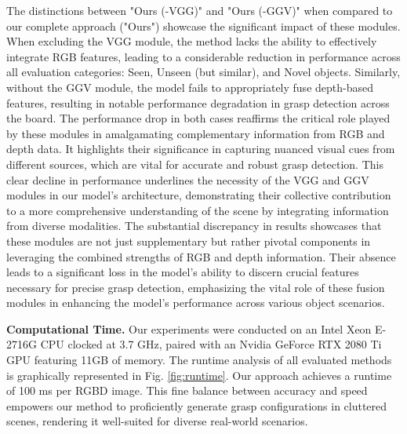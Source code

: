 The distinctions between "Ours (-VGG)" and "Ours (-GGV)" when compared to our complete approach ("Ours") showcase the significant impact of these modules. When excluding the VGG module, the method lacks the ability to effectively integrate RGB features, leading to a considerable reduction in performance across all evaluation categories: Seen, Unseen (but similar), and Novel objects. Similarly, without the GGV module, the model fails to appropriately fuse depth-based features, resulting in notable performance degradation in grasp detection across the board. The performance drop in both cases reaffirms the critical role played by these modules in amalgamating complementary information from RGB and depth data. It highlights their significance in capturing nuanced visual cues from different sources, which are vital for accurate and robust grasp detection. This clear decline in performance underlines the necessity of the VGG and GGV modules in our model's architecture, demonstrating their collective contribution to a more comprehensive understanding of the scene by integrating information from diverse modalities. The substantial discrepancy in results showcases that these modules are not just supplementary but rather pivotal components in leveraging the combined strengths of RGB and depth information. Their absence leads to a significant loss in the model's ability to discern crucial features necessary for precise grasp detection, emphasizing the vital role of these fusion modules in enhancing the model's performance across various object scenarios.

\textbf{Computational Time.} Our experiments were conducted on an Intel Xeon E-2716G CPU clocked at 3.7 GHz, paired with an Nvidia GeForce RTX 2080 Ti GPU featuring 11GB of memory. The runtime analysis of all evaluated methods is graphically represented in Fig. \ref{fig:runtime}. Our approach achieves a runtime of 100 ms per RGBD image. This fine balance between accuracy and speed empowers our method to proficiently generate grasp configurations in cluttered scenes, rendering it well-suited for diverse real-world scenarios.

